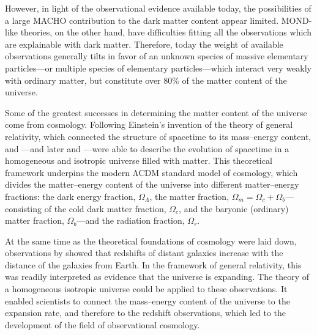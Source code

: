 However, in light of the observational evidence available today, the possibilities of a large MACHO contribution to the dark matter content appear limited. MOND-like theories, on the other hand, have difficulties fitting all the observations which are explainable with dark matter. Therefore, today the weight of available observations generally tilts in favor of an unknown species of massive elementary particles---or multiple species of elementary particles---which interact very weakly with ordinary matter, but constitute over 80\% of the matter content of the universe.

Some of the greatest successes in determining the matter content of the universe come from cosmology. Following Einstein's invention of the theory of general relativity, which connected the structure of spacetime to its mass--energy content, \textcites{Friedmann1922, Friedmann1924} and \textcite{Lemaitre1927}---and later \textcites{Robertson1935, Robertson1936a, Robertson1936b} and \textcite{Walker1937}---were able to describe the evolution of spacetime in a homogeneous and isotropic universe filled with matter. This theoretical framework underpins the modern ΛCDM standard model of cosmology, which divides the matter--energy content of the universe into different matter--energy fractions: the dark energy fraction, $\Omega_\Lambda$, the matter fraction, $\Omega_m=\Omega_c+\Omega_b$---consisting of the cold dark matter fraction, $\Omega_c$, and the baryonic (ordinary) matter fraction, $\Omega_b$---and the radiation fraction, $\Omega_r$.

At the same time as the theoretical foundations of cosmology were laid down, observations by \textcites{Slipher1917, Wirtz1922, Wirtz1924, Hubble1929} showed that redshifts of distant galaxies increase with the distance of the galaxies from Earth. In the framework of general relativity, this was readily interpreted as evidence that the universe is expanding. The theory of a homogeneous isotropic universe could be applied to these observations. It enabled scientists to connect the mass--energy content of the universe to the expansion rate, and therefore to the redshift observations, which led to the development of the field of observational cosmology.

